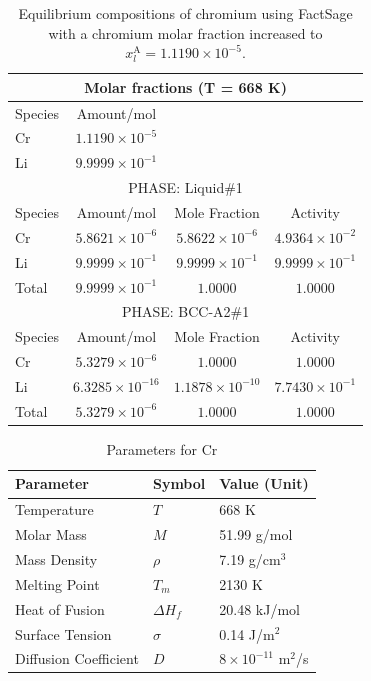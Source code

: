 \begin{table}[ht]
	\centering
	\label{tab:molar_fractions_cr_li_updated}
	\begin{tabular}{lccc}
	\hline
	\multicolumn{4}{c}{Molar fractions (T = 668 K)} \\
	\hline
	Species & Amount/mol & & \\
	\hline
	Cr & $1.1190 \times 10^{-5}$ & & \\
	Li & $9.9999 \times 10^{-1}$ & & \\
	\hline
	\multicolumn{4}{c}{PHASE: Liquid\#1} \\
	\hline
	Species & Amount/mol & Mole Fraction & Activity \\
	\hline
	Cr & $5.8621 \times 10^{-6}$ & $5.8622 \times 10^{-6}$ & $4.9364 \times 10^{-2}$ \\
	Li & $9.9999 \times 10^{-1}$ & $9.9999 \times 10^{-1}$ & $9.9999 \times 10^{-1}$ \\
	Total & $9.9999 \times 10^{-1}$ & $1.0000$ & $1.0000$ \\
	\hline
	\multicolumn{4}{c}{PHASE: BCC-A2\#1} \\
	\hline
	Species & Amount/mol & Mole Fraction & Activity \\
	\hline
	Cr & $5.3279 \times 10^{-6}$ & $1.0000$ & $1.0000$ \\
	Li & $6.3285 \times 10^{-16}$ & $1.1878 \times 10^{-10}$ & $7.7430 \times 10^{-1}$ \\
	Total & $5.3279 \times 10^{-6}$ & $1.0000$ & $1.0000$ \\
	\hline
	\end{tabular}
	\caption{Equilibrium compositions of chromium using FactSage with a chromium molar fraction increased to $x^{\text{A}}_{l} = 1.1190 \times 10^{-5}$.}
\end{table}


\begin{table}[h]
    \centering
    \begin{tabular}{|l|l|l|}
    \hline
    \textbf{Parameter} & \textbf{Symbol} & \textbf{Value (Unit)} \\ \hline
    Temperature        & $T$             & 668 K                 \\ \hline
    Molar Mass         & $M$             & 51.99 g/mol         \\ \hline
    Mass Density       & $\rho$          & 7.19 g/cm$^3$         \\ \hline
    Melting Point      & $T_m$           & 2130 K                \\ \hline
    Heat of Fusion     & $\Delta H_f$    & 20.48 kJ/mol           \\ \hline
    Surface Tension    & $\sigma$        & 0.14 J/m$^2$          \\ \hline
	Diffusion Coefficient & $D$          & $8 \times 10^{-11}$ m$^2$/s \\ \hline
    \end{tabular}
    \caption{Parameters for Cr}
    \label{tab:params_Cr}
\end{table}


